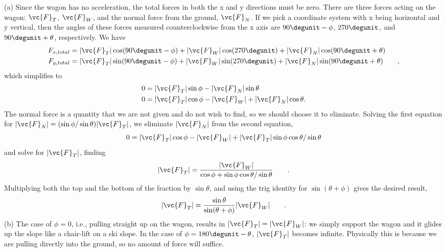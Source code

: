 (a) Since the wagon has no acceleration, the total
forces in both the x and y directions must be zero.
There are three forces acting on the wagon: $\vc{F}_T$, $\vc{F}_W$,
and the normal force from the ground, $\vc{F}_N$. If we pick a
coordinate system with x being horizontal and y
vertical, then the angles of these forces measured
counterclockwise from the x axis are $90\degunit-\phi$,
$270\degunit$, and $90\degunit+\theta$, respectively. We have
\begin{align*}
    F_{x,total}
             & =   |\vc{F}_T|\cos (90\degunit-\phi ) 
                 + |\vc{F}_W|\cos (270\degunit)
                 + |\vc{F}_N|\cos (90\degunit+\theta )\\
    F_{y,total}
             & =  |\vc{F}_T|\sin (90\degunit-\phi )
                + |\vc{F}_W|\sin (270\degunit)
                + |\vc{F}_N|\sin (90\degunit+\theta )   \qquad   ,
\end{align*}
which simplifies to
\begin{align*}
        0  &=  |\vc{F}_T|\sin  \phi  - |\vc{F}_N|\sin  \theta   \\
        0  &=  |\vc{F}_T|\cos  \phi   - |\vc{F}_W| + |\vc{F}_N|\cos  \theta   .
\end{align*}
The normal force is a quantity that we are not given and do
not wish to find, so we should choose it to eliminate.
Solving the first equation for $|\vc{F}_N|=(\sin  \phi/\sin  \theta)|\vc{F}_T|$,
 we eliminate $|\vc{F}_N|$ from the second equation,
\begin{equation*}
        0  =   |\vc{F}_T|\cos  \phi   
             - |\vc{F}_W| + |\vc{F}_T|\sin  \phi \cos  \theta/\sin  \theta
\end{equation*}
and solve for $|\vc{F}_T|$, finding
\begin{equation*}
    |\vc{F}_T| = \frac{|\vc{F}_W|}{\cos\phi+\sin\phi\cos\theta/\sin\theta} \qquad .
\end{equation*}
Multiplying both the top and the bottom of the fraction by
$\sin  \theta $, and using the trig identity for 
$\sin(\theta +\phi )$ gives the desired result,
\begin{equation*}
    |\vc{F}_T| = \frac{\sin\theta}{\sin(\theta+\phi)} |\vc{F}_W| \qquad .
\end{equation*}
(b) The case of $\phi=0$, i.e., pulling straight up on the
wagon, results in $|\vc{F}_T|=|\vc{F}_W|$: we simply support the wagon and
it glides up the slope like a chair-lift on a ski slope. In
the case of $\phi =180\degunit-\theta$, $|\vc{F}_T|$ becomes infinite.
Physically this is because we are pulling directly into the
ground, so no amount of force will suffice.
